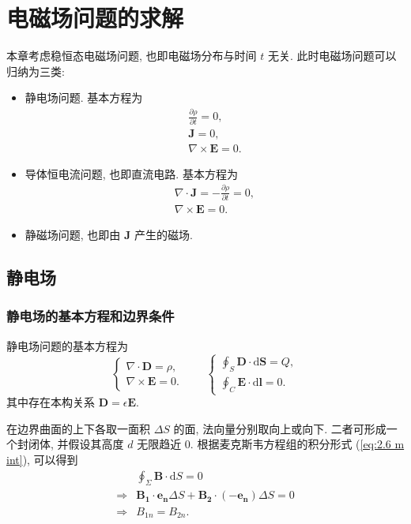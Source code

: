 \section{电磁场问题的求解} \label{3}
本章考虑稳恒态电磁场问题, 也即电磁场分布与时间 $t$ 无关. 此时电磁场问题可以归纳为三类:
\begin{itemize}
    \item 静电场问题. 基本方程为
          \begin{gather*}
              \frac{\partial\rho}{\partial t}=0, \\
              \bm{J}=0, \\
              \nabla\times\bm{E}=0.
          \end{gather*}
    \item 导体恒电流问题, 也即直流电路. 基本方程为
          \begin{gather*}
              \nabla\cdot\bm{J}=-\frac{\partial\rho}{\partial t}=0, \\
              \nabla\times\bm{E}=0.
          \end{gather*}
    \item 静磁场问题, 也即由 $\bm{J}$ 产生的磁场.
\end{itemize}

\subsection{静电场}
\subsubsection{静电场的基本方程和边界条件}
静电场问题的基本方程为
\begin{equation} \label{eq:3.1 1}
    \begin{cases}
        \nabla\cdot\bm{D}=\rho, \\
        \nabla\times\bm{E}=0.
    \end{cases} \qquad
    \begin{cases}
        \oint_S\bm{D}\cdot\mathrm{d}\bm{S}=Q, \\
        \oint_C\bm{E}\cdot\mathrm{d}\bm{l}=0.
    \end{cases}
\end{equation}
其中存在本构关系 $\bm{D}=\epsilon\bm{E}$.

在边界曲面的上下各取一面积 $\Delta S$ 的面, 法向量分别取向上或向下. 二者可形成一个封闭体, 并假设其高度 $d$ 无限趋近 0. 根据麦克斯韦方程组的积分形式 (\ref{eq:2.6 m int}), 可以得到
\begin{equation} \label{eq:3.1 basic 1}
    \begin{aligned}
                    & \oint_\Sigma\bm{B}\cdot\mathrm{d}S=0                             \\
        \Rightarrow & \bm{B_1}\cdot\bm{e_n}\Delta S+\bm{B_2}\cdot(-\bm{e_n})\Delta S=0 \\
        \Rightarrow & B_{1n}=B_{2n}.
    \end{aligned}
\end{equation}

